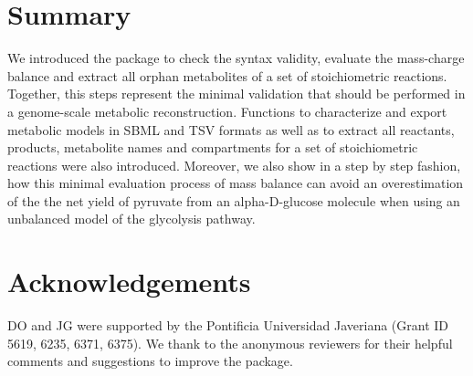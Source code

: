 \section{Summary}
We introduced the  package to check the syntax validity, evaluate the mass-charge balance and extract all orphan metabolites of a set of stoichiometric reactions. Together, this steps represent the minimal validation that should be performed in a genome-scale metabolic reconstruction. Functions to characterize and export metabolic models in SBML and TSV formats as well as to extract all reactants, products, metabolite names and compartments for a set of stoichiometric reactions were also introduced. Moreover, we also show in a step by step fashion, how this minimal evaluation process of mass balance can avoid an overestimation of the the net yield of pyruvate from an alpha-D-glucose molecule when using an unbalanced model of the glycolysis pathway.

\section{Acknowledgements}
DO and JG  were supported by the Pontificia Universidad Javeriana (Grant ID 5619, 6235, 6371, 6375). We thank to the anonymous reviewers for their helpful comments and suggestions to improve the package.


\address{Daniel Osorio\\
Grupo de Investigación en Bioinformática y Biología de Sistemas\\
Instituto de Genética, Universidad Nacional de Colombia\\
Bogotá\\
Colombia\\}

\address{Janneth Gonzalez\\
Grupo de Investigación en Bioquímica Experimental y Computacional\\
Facultad de Ciencias, Pontificia Universidad Javeriana\\
Bogotá\\
Colombia\\}

\address{Andres Pinzon\\
Grupo de Investigación en Bioinformática y Biología de Sistemas\\
Instituto de Genética, Universidad Nacional de Colombia\\
Bogotá\\
Colombia\\}
